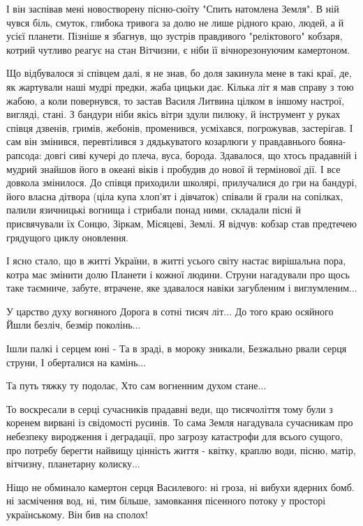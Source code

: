 І він заспівав мені новостворену пісню-сюїту "Спить натомлена Земля". В ній
чувся біль, смуток, глибока тривога за долю не лише рідного краю, людей, а й
усієї планети. Пізніше я збагнув, що зустрів правдивого "реліктового" кобзаря,
котрий чутливо реагує на стан Вітчизни, є ніби її вічнорезонуючим камертоном.

Що відбувалося зі співцем далі, я не знав, бо доля закинула мене в такі краї,
де, як жартували наші мудрі предки, жаба цицьки дає. Кілька літ я мав справу з
тою жабою, а коли повернувся, то застав Василя Литвина цілком в іншому настрої,
вигляді, стані. З бандури ніби якісь вітри здули пилюку, й інструмент у руках
співця дзвенів, гримів, жебонів, променився, усміхався, погрожував, застерігав.
І сам він змінився, перевтілився з дядькуватого козарлюги у правдавнього
бояна-рапсода: довгі сиві кучері до плеча, вуса, борода. Здавалося, що хтось
прадавній і мудрий знайшов його в океані віків і пробудив до нової й термінової
дії. І все довкола змінилося. До співця приходили школярі, прилучалися до гри
на бандурі, його власна дітвора (ціла купа хлоп'ят і дівчаток) співали й грали
на сопілках, палили язичницькі вогнища і стрибали понад ними, складали пісні й
присвячували їх Сонцю, Зіркам, Місяцеві, Землі. Я відчув: кобзар став предтечею
грядущого циклу оновлення.

І ясно стало, що в житті України, в житті усього світу настає вирішальна пора,
котра має змінити долю Планети і кожної людини. Струни нагадували про щось таке
таємниче, забуте, втрачене, яке здавалося навіки загубленим і виглумленим...

У царство духу вогняного
Дорога в сотні тисяч літ...
До того краю осяйного
Йшли безліч, безмір поколінь...

Ішли палкі і серцем юні -
Та в зраді, в мороку зникали,
Безжально рвали серця струни,
І оберталися на камінь...

Та путь тяжку ту подолає,
Хто сам вогненним духом стане...

То воскресали в серці сучасників прадавні веди, що тисячоліття тому були з
коренем вирвані із свідомості русинів. То сама Земля нагадувала сучасникам про
небезпеку виродження і деградації, про загрозу катастрофи для всього сущого,
про потребу берегти найвищу цінність життя - квітку, краплю води, пісню, матір,
вітчизну, планетарну колиску...

Ніщо не обминало камертон серця Василевого: ні гроза, ні вибухи ядерних бомб.
ні засмічення вод, ні, тим більше, замовкання пісенного потоку у просторі
українському. Він бив на сполох!

